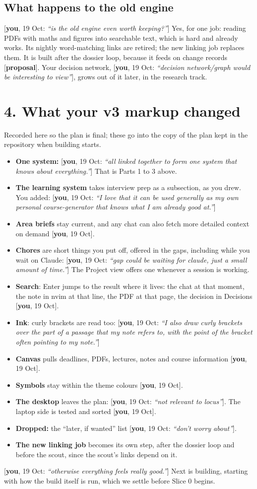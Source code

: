 \documentclass[10pt]{extarticle}
\newcommand{\you}[2]{{\small[\textbf{you}, #1: \textit{``#2''}]}}
\newcommand{\youx}[1]{{\small[\textbf{you}, #1]}}
\newcommand{\prop}{{\small[\textbf{proposal}]}}
\newcommand{\Sec}[1]{\section*{#1}}
\newcommand{\Sub}[1]{\subsection*{#1}}
\begin{document}
\Sub{What happens to the old engine}
\you{19 Oct}{is the old engine even worth keeping?} Yes, for one job: reading PDFs with maths and figures into searchable text, which is hard and already works. Its nightly word-matching links are retired; the new linking job replaces them. It is built after the dossier loop, because it feeds on change records \prop. Your decision network, \you{19 Oct}{decision network/graph would be interesting to view}, grows out of it later, in the research track.

\clearpage
\Sec{4. What your v3 markup changed}
Recorded here so the plan is final; these go into the copy of the plan kept in the repository when building starts.
\begin{itemize}
\item \textbf{One system:} \you{19 Oct}{all linked together to form one system that knows about everything.} That is Parts 1 to 3 above.
\item \textbf{The learning system} takes interview prep as a subsection, as you drew. You added: \you{19 Oct}{I love that it can be used generally as my own personal course-generator that knows what I am already good at.}
\item \textbf{Area briefs} stay current, and any chat can also fetch more detailed context on demand \youx{19 Oct}.
\item \textbf{Chores} are short things you put off, offered in the gaps, including while you wait on Claude: \you{19 Oct}{gap could be waiting for claude, just a small amount of time.} The Project view offers one whenever a session is working.
\item \textbf{Search}: Enter jumps to the result where it lives: the chat at that moment, the note in nvim at that line, the PDF at that page, the decision in Decisions \youx{19 Oct}.
\item \textbf{Ink}: curly brackets are read too: \you{19 Oct}{I also draw curly brackets over the part of a passage that my note refers to, with the point of the bracket often pointing to my note.}
\item \textbf{Canvas} pulls deadlines, PDFs, lectures, notes and course information \youx{19 Oct}.
\item \textbf{Symbols} stay within the theme colours \youx{19 Oct}.
\item \textbf{The desktop} leaves the plan: \you{19 Oct}{not relevant to locus}. The laptop side is tested and sorted \youx{19 Oct}.
\item \textbf{Dropped:} the ``later, if wanted'' list \you{19 Oct}{don't worry about}.
\item \textbf{The new linking job} becomes its own step, after the dossier loop and before the scout, since the scout's links depend on it.
\end{itemize}

\medskip
\you{19 Oct}{otherwise everything feels really good.} Next is building, starting with how the build itself is run, which we settle before Slice 0 begins.
\end{document}
